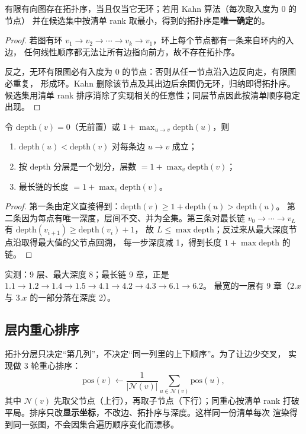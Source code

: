 \begin{theorem}[拓扑序的存在性]\label{thm:topo}
有限有向图存在拓扑序，当且仅当它无环；若用 Kahn 算法（每次取入度为 0 的节点）
并在候选集中按清单 rank 取最小，得到的拓扑序是\textbf{唯一确定}的。
\end{theorem}

\begin{proof}
若图有环 $v_1\to v_2\to\cdots\to v_k\to v_1$，环上每个节点都有一条来自环内的入边，
任何线性顺序都无法让所有边指向前方，故不存在拓扑序。

反之，无环有限图必有入度为 0 的节点：否则从任一节点沿入边反向走，有限图必重复，
形成环。Kahn 删除该节点及其出边后余图仍无环，归纳即得拓扑序。候选集用清单 rank
排序消除了实现相关的任意性；同层节点因此按清单顺序稳定出现。
\end{proof}

\begin{theorem}[最长路径分层]\label{thm:depth}
令 $\mathrm{depth}(v)=0$（无前置）或 $1+\max_{u\to v}\mathrm{depth}(u)$，则
\begin{enumerate}
  \item $\mathrm{depth}(u)<\mathrm{depth}(v)$ 对每条边 $u\to v$ 成立；
  \item 按 $\mathrm{depth}$ 分层是一个划分，层数 $=1+\max_v\mathrm{depth}(v)$；
  \item 最长链的长度 $=1+\max_v\mathrm{depth}(v)$。
\end{enumerate}
\end{theorem}

\begin{proof}
第一条由定义直接得到：$\mathrm{depth}(v)\ge 1+\mathrm{depth}(u)>\mathrm{depth}(u)$。
第二条因为每点有唯一深度，层间不交、并为全集。第三条对最长链
$v_0\to\cdots\to v_L$ 有 $\mathrm{depth}(v_{i+1})\ge\mathrm{depth}(v_i)+1$，
故 $L\le\max\mathrm{depth}$；反过来从最大深度节点沿取得最大值的父节点回溯，
每一步深度减 1，得到长度 $1+\max\mathrm{depth}$ 的链。
\end{proof}

实测：9 层、最大深度 8；最长链 9 章，正是
$1.1\to1.2\to1.4\to1.5\to4.1\to4.2\to4.3\to6.1\to6.2$。
最宽的一层有 9 章（$2.x$ 与 $3.x$ 的一部分落在深度 2）。

\subsection{层内重心排序}

拓扑分层只决定“第几列”，不决定“同一列里的上下顺序”。为了让边少交叉，
实现做 3 轮重心排序：
\[
  \text{pos}(v)\leftarrow \frac{1}{|\mathcal N(v)|}
  \sum_{u\in\mathcal N(v)}\text{pos}(u),
\]
其中 $\mathcal N(v)$ 先取父节点（上行），再取子节点（下行）；同重心按清单 rank
打破平局。排序只改\textbf{显示坐标}，不改边、拓扑序与深度。这样同一份清单每次
渲染得到同一张图，不会因集合遍历顺序变化而漂移。

